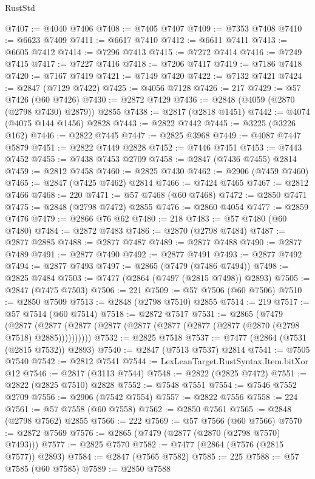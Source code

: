 \begin{lexlean}{RustStd}
\begin{coremodule}
@7407 := @4040 @7406
@7408 := @7405 @7407
@7409 := @7353 @7408
@7410 := @6623 @7409
@7411 := @6617 @7410
@7412 := @6611 @7411
@7413 := @6605 @7412
@7414 := @7296 @7413
@7415 := @7272 @7414
@7416 := @7249 @7415
@7417 := @7227 @7416
@7418 := @7206 @7417
@7419 := @7186 @7418
@7420 := @7167 @7419
@7421 := @7149 @7420
@7422 := @7132 @7421
@7424 := @2847 (@7129 @7422)
@7425 := @4056 @7128
@7426 := 217
@7429 := @57 @7426 (@60 @7426)
@7430 := @2872 @7429
@7436 := @2848 (@4059 (@2870 (@2798 @7430) @2879)) @2855
@7438 := @2817 (@2818 @1451)
@7442 := @4074 (@4075 @144 @1456) @2828
@7443 := @2822 @7442
@7445 := @3225 (@3226 @162)
@7446 := @2822 @7445
@7447 := @2825 @3968
@7449 := @4087 @7447 @5879
@7451 := @2822 @7449 @2828
@7452 := @7446 @7451
@7453 := @7443 @7452
@7455 := @7438 @7453 @2709
@7458 := @2847 (@7436 @7455) @2814
@7459 := @2812 @7458
@7460 := @2825 @7430
@7462 := @2906 (@7459 @7460)
@7465 := @2847 (@7425 @7462) @2814
@7466 := @7424 @7465
@7467 := @2812 @7466
@7468 := 220
@7471 := @57 @7468 (@60 @7468)
@7472 := @2850 @7471
@7475 := @2848 (@2798 @7472) @2855
@7476 := @2860 @4054
@7477 := @2859 @7476
@7479 := @2866 @76 @62
@7480 := 218
@7483 := @57 @7480 (@60 @7480)
@7484 := @2872 @7483
@7486 := @2870 (@2798 @7484)
@7487 := @2877 @2885
@7488 := @2877 @7487
@7489 := @2877 @7488
@7490 := @2877 @7489
@7491 := @2877 @7490
@7492 := @2877 @7491
@7493 := @2877 @7492
@7494 := @2877 @7493
@7497 := @2865 (@7479 (@7486 @7494))
@7498 := @2825 @7484
@7503 := @7477 (@2864 (@7497 (@2815 @7498)) @2893)
@7505 := @2847 (@7475 @7503)
@7506 := 221
@7509 := @57 @7506 (@60 @7506)
@7510 := @2850 @7509
@7513 := @2848 (@2798 @7510) @2855
@7514 := 219
@7517 := @57 @7514 (@60 @7514)
@7518 := @2872 @7517
@7531 := @2865
    (@7479
      (@2877 (@2877 (@2877 (@2877 (@2877 (@2877 (@2877 (@2877 (@2870 (@2798 @7518) @2885))))))))))
@7532 := @2825 @7518
@7537 := @7477 (@2864 (@7531 (@2815 @7532)) @2893)
@7540 := @2847 (@7513 @7537) @2814
@7541 := @7505 @7540
@7542 := @2812 @7541
@7544 := LexLeanTarget.RustSyntax.Item.bitXor @12
@7546 := @2817 (@3113 @7544)
@7548 := @2822 (@2825 @7472)
@7551 := @2822 (@2825 @7510) @2828
@7552 := @7548 @7551
@7554 := @7546 @7552 @2709
@7556 := @2906 (@7542 @7554)
@7557 := @2822 @7556
@7558 := 224
@7561 := @57 @7558 (@60 @7558)
@7562 := @2850 @7561
@7565 := @2848 (@2798 @7562) @2855
@7566 := 222
@7569 := @57 @7566 (@60 @7566)
@7570 := @2872 @7569
@7576 := @2865 (@7479 (@2877 (@2870 (@2798 @7570) @7493)))
@7577 := @2825 @7570
@7582 := @7477 (@2864 (@7576 (@2815 @7577)) @2893)
@7584 := @2847 (@7565 @7582)
@7585 := 225
@7588 := @57 @7585 (@60 @7585)
@7589 := @2850 @7588

\end{coremodule}
\end{lexlean}
